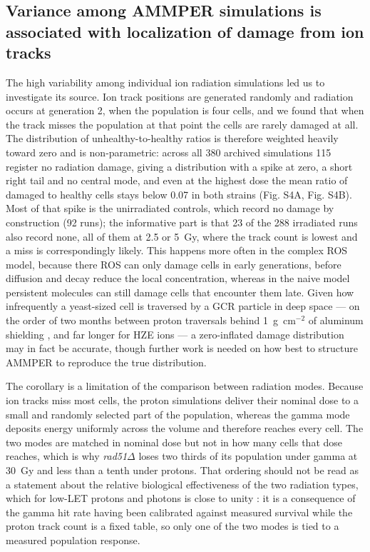 \documentclass{asmarticle}
\begin{document}
\subsection{Variance among AMMPER simulations is associated with localization of damage from ion tracks}
The high variability among individual ion radiation simulations led us to investigate its source. Ion track positions are generated randomly and radiation occurs at generation 2, when the population is four cells, and we found that when the track misses the population at that point the cells are rarely damaged at all. The distribution of unhealthy-to-healthy ratios is therefore weighted heavily toward zero and is non-parametric: across all 380 archived simulations 115 register no radiation damage, giving a distribution with a spike at zero, a short right tail and no central mode, and even at the highest dose the mean ratio of damaged to healthy cells stays below 0.07 in both strains (Fig. S4A, Fig. S4B). Most of that spike is the unirradiated controls, which record no damage by construction (92 runs); the informative part is that 23 of the 288 irradiated runs also record none, all of them at 2.5 or 5~Gy, where the track count is lowest and a miss is correspondingly likely. This happens more often in the complex ROS model, because there ROS can only damage cells in early generations, before diffusion and decay reduce the local concentration, whereas in the naive model persistent molecules can still damage cells that encounter them late. Given how infrequently a yeast-sized cell is traversed by a GCR particle in deep space --- on the order of two months between proton traversals behind 1~g~cm$^{-2}$ of aluminum shielding \cite{straume2017cosmic, singh2023agent}, and far longer for HZE ions --- a zero-inflated damage distribution may in fact be accurate, though further work is needed on how best to structure AMMPER to reproduce the true distribution.

The corollary is a limitation of the comparison between radiation modes. Because ion tracks miss most cells, the proton simulations deliver their nominal dose to a small and randomly selected part of the population, whereas the gamma mode deposits energy uniformly across the volume and therefore reaches every cell. The two modes are matched in nominal dose but not in how many cells that dose reaches, which is why \textit{rad51}$\Delta$ loses two thirds of its population under gamma at 30~Gy and less than a tenth under protons. That ordering should not be read as a statement about the relative biological effectiveness of the two radiation types, which for low-LET protons and photons is close to unity \cite{terato2014quantitative}: it is a consequence of the gamma hit rate having been calibrated against measured survival while the proton track count is a fixed table, so only one of the two modes is tied to a measured population response.
\end{document}
